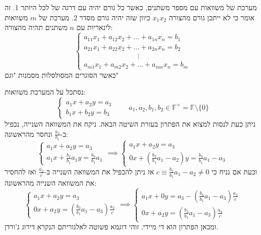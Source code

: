\documentclass{tstextbook}
\begin{document}
\begin{definition}
מערכת של משוואות עם מספר משתנים, כאשר כל גורם יהיה עם דרגה של לכל היותר 1. זה אומר כי לא ייתכן גורם מהצורה \(x_{1}x_{2}\) כיוון שזה יהיה גורם מסדר 2. מערכת של \(m\) משוואות לינאריות עם \(n\) משתנים תהיה מהצורה:
$$\begin{cases}a_{11}x_{1}+a_{12}x_{2}+\dots+a_{1n}x_{n}=b_{1} \\a_{21}x_{1}+a_{22}x_{2}+\dots+a_{2n}x_{n}=b_{2} \\\qquad \qquad \qquad \quad \;\;\vdots \\a_{m 1}x_{1}+a_{m2}x_{2}+\dots+a_{mn}x_{n}=b_{m}
\end{cases}$$
כאשר הסוגרים המסולסלות מסמנות "וגם"

\end{definition}
\begin{example}
נסתכל על המערכת משוואות:
$$\begin{cases}a_{1}x+a_{2}y=a_{3}  \\b_{1}x+b_{2}y=b_{3}
\end{cases}\qquad a_{1},a_{2},b_{1},b_{2}\in \mathbb{F}  ^{\times}=\mathbb{F}  \setminus \{ 0 \}$$
ניתן כעת לנסות למצוא את הפתרון בעזרת השיטה הבאה. ניקח את המשוואה השנייה, נכפיל ב-\(\frac{a_{1}}{b_{1}}\) ונחסר מהראשונה:
$$\begin{cases}a_{1}x+a_{2}y=a_{3} \\a_{1}x+\frac{b_{2}}{b_{1}}a_{1}y=\frac{b_{3}}{b_{1}}a_{1} \end{cases}\implies \begin{cases}a_{1}x+a_{2}y=a_{3} \\0x +\left( \frac{b_{2}}{b_{1}}a_{1}-a_{2} \right)y=\frac{b_{3}}{b_{1}}a_{1}-a_{3}
\end{cases}$$
וכעת אם נניח כי \(c\equiv\frac{b_{2}}{b_{1}}a_{1}-a_{2}\neq 0\) אז ניתן להכפיל את המשוואה השנייה ב-\(\frac{a_{2}}{c}\) ואז להחסיר את המשוואה השנייה מהראשונה:
$$\begin{cases}a_{1}x+a_{2}y=a_{3} \\0x+a_{2}y=\left( \frac{b_{3}}{b_{1}}a_{1}-a_{3} \right) \frac{a_{2}}{c}\end{cases}\implies \begin{cases}a_{1}x+0y=a_{3}-\left( \frac{b_{3}}{b_{1}}a_{1}-a_{3} \right) \frac{a_{2}}{c} \\0x+a_{2}y=\left( \frac{b_{3}}{b_{1}}a_{1}-a_{3} \right) \frac{a_{2}}{c}
\end{cases}$$
ומכאן הפתרון הוא די מיידי. זוהי דוגמא פשוטה לאלגוריתם הנקרא דירוג ג'ורדן.

\end{example}
\end{document}
